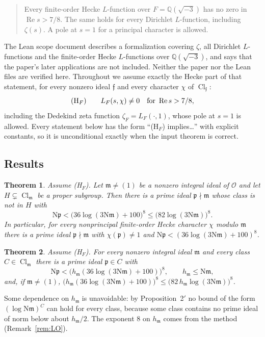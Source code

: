\documentclass[11pt]{article}
\newtheorem{mainthm}{Theorem}
\theoremstyle{definition}
\theoremstyle{remark}
\numberwithin{equation}{section}
\newcommand{\Q}{\mathbb Q}
\newcommand{\cO}{\mathcal O}
\newcommand{\fp}{\mathfrak p}
\newcommand{\fm}{\mathfrak m}
\newcommand{\ff}{\mathfrak f}
\newcommand{\Nm}{\mathrm N}
\newcommand{\Cl}{\operatorname{Cl}}
\newcommand{\Rea}{\operatorname{Re}}
\newcommand{\HF}{\textup{(H$_F$)}}
\begin{document}
\begin{quote}
Every finite-order Hecke $L$-function over $F=\Q(\sqrt{-3})$ has no zero in $\Rea s>7/8$. The same holds for every Dirichlet $L$-function, including $\zeta(s)$. A pole at $s=1$ for a principal character is allowed.
\end{quote}

The Lean scope document \cite{openai2026lean} describes a formalization covering $\zeta$, all Dirichlet $L$-functions and the finite-order Hecke $L$-functions over $\Q(\sqrt{-3})$, and says that the paper's later applications are not included. Neither the paper nor the Lean files are verified here. Throughout we assume exactly the Hecke part of that statement, for every nonzero ideal $\ff$ and every character $\chi$ of $\Cl_\ff$:
\begin{equation}\label{eq:HF}
\HF\qquad L_F(s,\chi)\ne0\quad\text{for }\Rea s>7/8,
\end{equation}
including the Dedekind zeta function $\zeta_F=L_F(\cdot,1)$, whose pole at $s=1$ is allowed. Every statement below has the form ``\HF{} implies\ldots'' with explicit constants, so it is unconditional exactly when the input theorem is correct.

\subsection*{Results}

\begin{mainthm}\label{thm:1}
Assume \HF. Let $\fm\ne(1)$ be a nonzero integral ideal of $\cO$ and let $H\subsetneq\Cl_\fm$ be a proper subgroup. Then there is a prime ideal $\fp\nmid\fm$ whose class is not in $H$ with
\[
 \Nm\fp<\bigl(36\log(3\Nm\fm)+100\bigr)^8\le\bigl(82\log(3\Nm\fm)\bigr)^8 .
\]
In particular, for every nonprincipal finite-order Hecke character $\chi$ modulo $\fm$ there is a prime ideal $\fp\nmid\fm$ with $\chi(\fp)\ne1$ and $\Nm\fp<(36\log(3\Nm\fm)+100)^8$.
\end{mainthm}

\begin{mainthm}\label{thm:2}
Assume \HF. For every nonzero integral ideal $\fm$ and every class $C\in\Cl_\fm$ there is a prime ideal $\fp\in C$ with
\[
 \Nm\fp<\bigl(h_\fm(36\log(3\Nm\fm)+100)\bigr)^8,\qquad h_\fm\le\Nm\fm ,
\]
and, if $\fm\ne(1)$, $\bigl(h_\fm(36\log(3\Nm\fm)+100)\bigr)^8\le\bigl(82\,h_\fm\log(3\Nm\fm)\bigr)^8$.
\end{mainthm}

Some dependence on $h_\fm$ is unavoidable: by Proposition~2$'$ no bound of the form $(\log\Nm\fm)^{C}$ can hold for every class, because some class contains no prime ideal of norm below about $h_\fm/2$. The exponent $8$ on $h_\fm$ comes from the method (Remark~\ref{rem:LO}).
\end{document}

